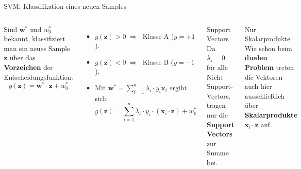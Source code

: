 \begin{frame}{SVM: Klassifikation eines neuen Samples}
\begin{columns}

Sind $\mathbf{w}^{*}$ und $w_0^{*}$ bekannt, klassifiziert man ein neues
Sample $\mathbf{z}$ über das \textbf{Vorzeichen} der Entscheidungsfunktion:
\[
  g(\mathbf{z}) = \mathbf{w}^{*}\!\cdot\mathbf{z} + w_0^{*}
\]

\begin{itemize}
  \item $g(\mathbf{z}) > 0 \;\Rightarrow\;$ Klasse A ($y = +1$).
  \item $g(\mathbf{z}) < 0 \;\Rightarrow\;$ Klasse B ($y = -1$).
  \item Mit $\mathbf{w}^{*} = \sum_{i=1}^{n}\lambda_i \cdot y_i \mathbf{x}_i$ ergibt sich:
        \[
        \boxed{
          g(\mathbf{z}) = \sum_{i=1}^{n}\lambda_i \cdot y_i\cdot 
          (\mathbf{x}_i\!\cdot\mathbf{z}) + w_0^{*}}
        \]
\end{itemize}

\begin{blockC1}{Support Vectors}
Da $\lambda_i = 0$ für alle Nicht-Support-Vectors, tragen nur die
\textbf{Support Vectors} zur Summe bei.
\end{blockC1}

\begin{blockC2}{Nur Skalarprodukte}
Wie schon beim \textbf{dualen Problem} treten die Vektoren auch hier
ausschließlich über \textbf{Skalarprodukte} $\mathbf{x}_i\!\cdot\mathbf{z}$
auf.
\end{blockC2}

\end{columns}
\end{frame}

